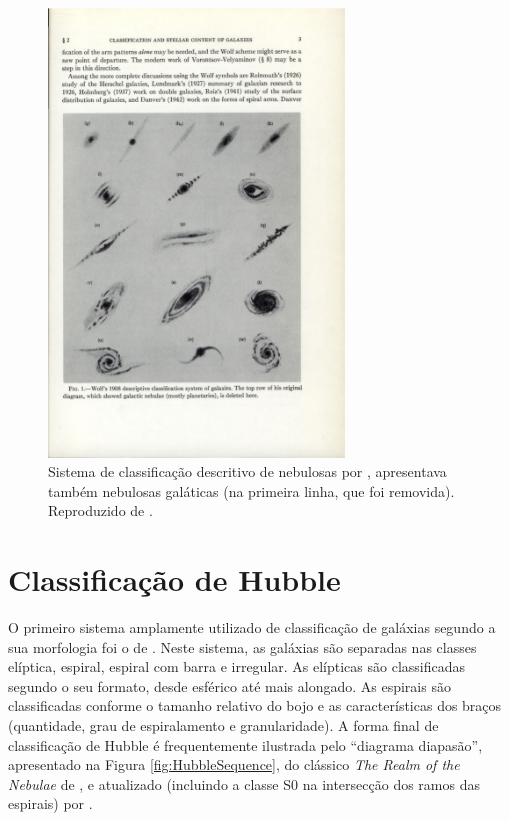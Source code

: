 \begin{figure}
	\includegraphics[width=0.7\textwidth]{figuras/WolfEarlyClass}
	\caption[Classificação de Wolf]
	{Sistema de classificação descritivo de nebulosas por \citet{Wolf1908},
	apresentava também nebulosas galáticas (na primeira linha, que foi removida).
	Reproduzido de \citet{Sandage1975}.}
	\label{fig:WolfEarlyClass}
\end{figure}



\section{Classificação de Hubble}

O primeiro sistema amplamente utilizado de classificação de galáxias segundo a
sua morfologia foi o de \citet{Hubble1926}. Neste sistema, as galáxias são
separadas nas classes elíptica, espiral, espiral com barra e irregular. As
elípticas são classificadas segundo o seu formato, desde esférico até mais
alongado. As espirais são classificadas conforme o tamanho relativo do bojo e as
características dos braços (quantidade, grau de espiralamento e granularidade).
A forma final de classificação de Hubble é frequentemente ilustrada pelo
``diagrama diapasão'', apresentado na Figura \ref{fig:HubbleSequence}, do
clássico {\em The Realm of the Nebulae} de \citet{hubble1936}, e atualizado
(incluindo a classe S0 na intersecção dos ramos das espirais) por
\citet{Sandage1975}.


